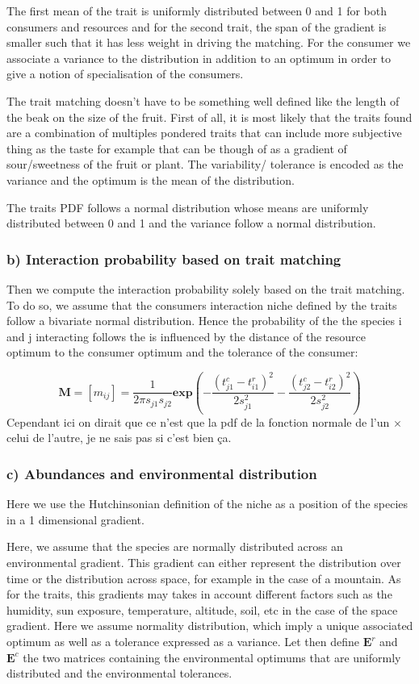 \documentclass{article}
\begin{document}
The first mean of the trait is uniformly distributed between 0 and 1 for both consumers and resources and for the second trait, the span of the gradient is smaller such that it has less weight in driving the matching. 
For the consumer we associate a variance to the distribution in addition to an optimum in order to give a notion of specialisation of the consumers.

The trait matching doesn't have to be something well defined like the length of the beak on the size of the fruit. First of all, it is most likely that the traits found are a combination of multiples pondered traits that can include more subjective thing as the taste for example that can be though of as a gradient of sour/sweetness of the fruit or plant.
The variability/ tolerance is encoded as the variance and the optimum is the mean of the distribution.

The traits PDF follows a normal distribution whose means are uniformly distributed between 0 and 1 and the variance follow a normal distribution.




\subsubsection{b) Interaction probability based on trait matching}
Then we compute the interaction probability  solely based on the trait matching. To do so, we assume that the consumers interaction niche defined by the traits follow a bivariate normal distribution. Hence the probability of the the species i and j interacting follows the is influenced by the distance of the resource optimum to the consumer optimum and the tolerance of the consumer:

$$\textbf{M} = [m_{ij}]=\frac{1}{2\pi s_{j1}s_{j2}} \textbf{exp}\left(-\frac{(t^c_{j1} - t^r_{i1})^2}{2s^2_{j1}} - \frac{(t^c_{j2} - t^r_{i2})^2}{2s^2_{j2}}\right)$$
Cependant ici on dirait que ce n'est que la pdf de la fonction normale de l'un $\times$ celui de l'autre, je ne sais pas si c'est bien ça.




\subsubsection{c) Abundances and environmental distribution}
Here we use the Hutchinsonian definition of the niche as a position of the species in a 1 dimensional gradient.

Here, we assume that the species are normally distributed across an environmental gradient. This gradient can either represent the distribution over time or the distribution across space, for example in the case of a mountain. As for the traits, this gradients may takes in account different factors such as the humidity, sun exposure, temperature, altitude, soil, etc in the case of the space gradient.
Here we assume normality distribution, which imply a unique associated optimum as well as a tolerance expressed as a variance. Let then define $\textbf{E}^r$ and $\textbf{E}^c$ the two matrices containing the environmental optimums that are uniformly distributed and the environmental tolerances.
\end{document}
